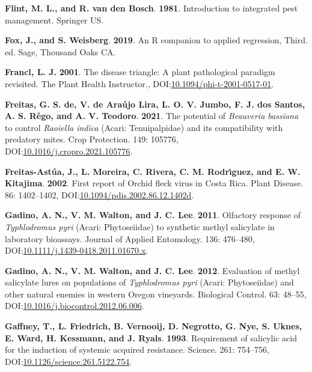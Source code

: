 \documentclass[12pt,final,CPage]{ufthesis}
\newlength{\cslhangindent}
\newenvironment{CSLReferences}[2] %
{%
	\setlength{\parindent}{0pt}
	\ifodd #1 \everypar{\setlength{\hangindent}{\cslhangindent}}\ignorespaces\fi
	\ifnum #2 > 0
	\setlength{\parskip}{#2\baselineskip}
	\fi
}%
{}
\begin{document}
{\begin{CSLReferences}{1}{0}
  \leavevmode{}%
  \textbf{Flint, M. L., and R. van den Bosch}. \textbf{1981}. Introduction to integrated pest management. Springer {US}.

  \leavevmode{}%
  \textbf{Fox, J., and S. Weisberg}. \textbf{2019}. An {R} companion to applied regression, Third. ed. Sage, Thousand Oaks {CA}.

  \leavevmode{}%
  \textbf{Francl, L. J.} \textbf{2001}. The disease triangle: A plant pathological paradigm revisited. The Plant Health Instructor., DOI:\href{https://doi.org/10.1094/phi-t-2001-0517-01}{10.1094/phi-t-2001-0517-01}.

  \leavevmode{}%
  \textbf{Freitas, G. S. de, V. de Araújo Lira, L. O. V. Jumbo, F. J. dos Santos, A. S. Rêgo, and A. V. Teodoro}. \textbf{2021}. The potential of {\emph{Beauveria bassiana}} to control {\emph{Raoiella indica}} ({Acari}: {Tenuipalpidae}) and its compatibility with predatory mites. Crop Protection. 149: 105776, DOI:\href{https://doi.org/10.1016/j.cropro.2021.105776}{10.1016/j.cropro.2021.105776}.

  \leavevmode{}%
  \textbf{Freitas-Astúa, J., L. Moreira, C. Rivera, C. M. Rodrı́guez, and E. W. Kitajima}. \textbf{2002}. First report of {Orchid fleck virus} in {Costa Rica}. Plant Disease. 86: 1402--1402, DOI:\href{https://doi.org/10.1094/pdis.2002.86.12.1402d}{10.1094/pdis.2002.86.12.1402d}.

  \leavevmode{}%
  \textbf{Gadino, A. N., V. M. Walton, and J. C. Lee}. \textbf{2011}. Olfactory response of {\emph{Typhlodromus pyri}} {({Acari}: {Phytoseiidae})} to synthetic methyl salicylate in laboratory bioassays. Journal of Applied Entomology. 136: 476--480, DOI:\href{https://doi.org/10.1111/j.1439-0418.2011.01670.x}{10.1111/j.1439-0418.2011.01670.x}.

  \leavevmode{}%
  \textbf{Gadino, A. N., V. M. Walton, and J. C. Lee}. \textbf{2012}. Evaluation of methyl salicylate lures on populations of {\emph{Typhlodromus pyri}} {({Acari}: {Phytoseiidae})} and other natural enemies in western {Oregon} vineyards. Biological Control. 63: 48--55, DOI:\href{https://doi.org/10.1016/j.biocontrol.2012.06.006}{10.1016/j.biocontrol.2012.06.006}.

  \leavevmode{}%
  \textbf{Gaffney, T., L. Friedrich, B. Vernooij, D. Negrotto, G. Nye, S. Uknes, E. Ward, H. Kessmann, and J. Ryals}. \textbf{1993}. Requirement of salicylic acid for the induction of systemic acquired resistance. Science. 261: 754--756, DOI:\href{https://doi.org/10.1126/science.261.5122.754}{10.1126/science.261.5122.754}.


\end{CSLReferences}}
\end{document}

